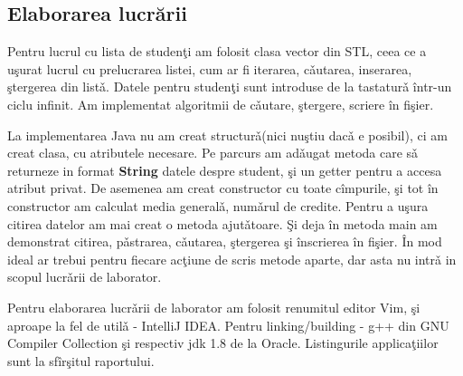 \subsection{Elaborarea lucr\u{a}rii}
Pentru lucrul cu lista de studen\c{t}i am folosit clasa vector din STL, ceea 
ce a u\c{s}urat lucrul cu prelucrarea listei, cum ar fi iterarea, c\v{a}utarea,
inserarea, \c{s}tergerea din list\v{a}. Datele pentru studen\c{t}i sunt introduse
de la tastatur\v{a} \^{i}ntr-un ciclu infinit. Am implementat algoritmii de c\v{a}utare, \c{s}tergere, scriere \^{i}n fi\c{s}ier. 

La implementarea Java nu am creat structur\v{a}(nici nu\c{s}tiu dac\v{a} e posibil), ci am creat clasa, cu atributele necesare. Pe parcurs am ad\v{a}ugat metoda 
care s\v{a} returneze in format \textbf{String} datele despre student, \c{s}i un getter pentru a accesa atribut privat. De asemenea am creat constructor cu toate c\^{i}mpurile, \c{s}i tot \^{i}n constructor am calculat media general\v{a}, num\v{a}rul de credite. Pentru a u\c{s}ura citirea datelor am mai creat o metoda
ajut\v{a}toare. \c{S}i deja \^{i}n metoda main am demonstrat citirea, p\v{a}strarea, c\v{a}utarea, \c{s}tergerea \c{s}i \^{i}nscrierea \^{i}n fi\c{s}ier. 
\^{I}n mod ideal ar trebui pentru fiecare ac\c{t}iune de scris metode aparte, 
dar asta nu intr\v{a} in scopul lucr\v{a}rii de laborator. 

Pentru elaborarea lucr\v{a}rii de laborator am folosit renumitul editor Vim, \c{s}i aproape la fel de util\v{a} - IntelliJ IDEA. Pentru linking/building - g++ din GNU Compiler Collection \c{s}i respectiv jdk 1.8 de la Oracle. Listingurile applica\c{t}iilor sunt la sf\^{i}r\c{s}itul raportului.
